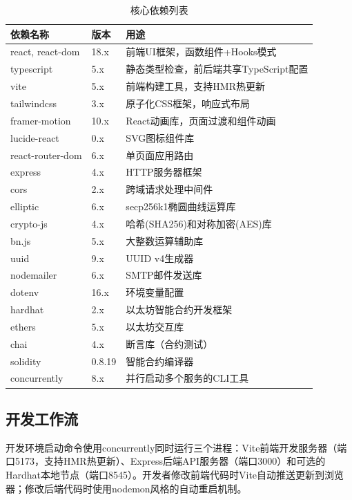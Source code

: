 \documentclass[UTF8,a4paper,zihao=-4,openany]{ctexrep}
\begin{document}
\begin{table}[htbp]
	\centering
	\caption{核心依赖列表}
	\begin{tabularx}{\textwidth}{p{4.5cm}p{3.5cm}p{7cm}}
		\toprule
		依赖名称 & 版本 & 用途\\
		\midrule
		react, react-dom & 18.x & 前端UI框架，函数组件+Hooks模式\\
		typescript & 5.x & 静态类型检查，前后端共享TypeScript配置\\
		vite & 5.x & 前端构建工具，支持HMR热更新\\
		tailwindcss & 3.x & 原子化CSS框架，响应式布局\\
		framer-motion & 10.x & React动画库，页面过渡和组件动画\\
		lucide-react & 0.x & SVG图标组件库\\
		react-router-dom & 6.x & 单页面应用路由\\
		express & 4.x & HTTP服务器框架\\
		cors & 2.x & 跨域请求处理中间件\\
		elliptic & 6.x & secp256k1椭圆曲线运算库\\
		crypto-js & 4.x & 哈希(SHA256)和对称加密(AES)库\\
		bn.js & 5.x & 大整数运算辅助库\\
		uuid & 9.x & UUID v4生成器\\
		nodemailer & 6.x & SMTP邮件发送库\\
		dotenv & 16.x & 环境变量配置\\
		hardhat & 2.x & 以太坊智能合约开发框架\\
		ethers & 5.x & 以太坊交互库\\
		chai & 4.x & 断言库（合约测试）\\
		solidity & 0.8.19 & 智能合约编译器\\
		concurrently & 8.x & 并行启动多个服务的CLI工具\\
		\bottomrule
	\end{tabularx}
\end{table}

\subsection{开发工作流}

开发环境启动命令使用concurrently同时运行三个进程：Vite前端开发服务器（端口5173，支持HMR热更新）、Express后端API服务器（端口3000）和可选的Hardhat本地节点（端口8545）。开发者修改前端代码时Vite自动推送更新到浏览器；修改后端代码时使用nodemon风格的自动重启机制。
\end{document}
